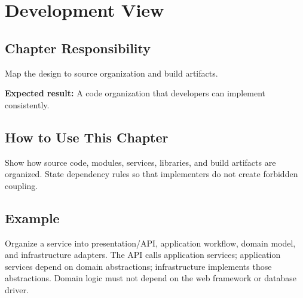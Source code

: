 \chapter{Development View}
\section{Chapter Responsibility}
\label{Section:DevelopmentViewResponsibility}
Map the design to source organization and build artifacts.

\noindent\textbf{Expected result:} A code organization that developers can implement consistently.

\section{How to Use This Chapter}
Show how source code, modules, services, libraries, and build artifacts are organized. State dependency rules so that implementers do not create forbidden coupling.
\section{Example}
Organize a service into presentation/API, application workflow, domain model, and infrastructure adapters. The API calls application services; application services depend on domain abstractions; infrastructure implements those abstractions. Domain logic must not depend on the web framework or database driver.
